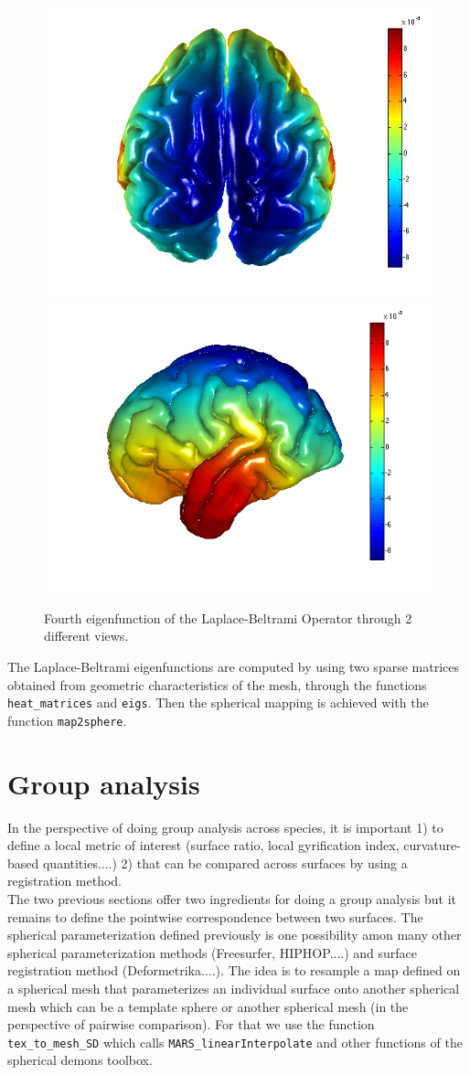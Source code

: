 \documentclass[a4paper, oneside, 12pt, onecolumn]{article}
\begin{document}
\begin{figure}
\center
\includegraphics[width=0.32\linewidth]{Figs/orang_VP4_1.png}
\includegraphics[width=0.32\linewidth]{Figs/orang_VP4_2.png}
\caption{Fourth eigenfunction of the Laplace-Beltrami Operator through 2 different views.}
\label{Fig3}
\end{figure}

The Laplace-Beltrami eigenfunctions are computed by using two sparse matrices obtained from geometric characteristics of the mesh, through the functions \texttt{heat\_matrices} and \texttt{eigs}. Then the spherical mapping is achieved with the function \texttt{map2sphere}.

\section{Group analysis}

In the perspective of doing group analysis across species, it is important 1) to define a local metric of interest (surface ratio, local gyrification index, curvature-based quantities....) 2) that can be compared across surfaces by using a registration method.\\

The two previous sections offer two ingredients for doing a group analysis but it remains to define the pointwise correspondence between two surfaces. The spherical parameterization defined previously is one possibility amon many other spherical parameterization methods (Freesurfer, HIPHOP....) and surface registration method (Deformetrika....). The idea is to resample a map defined on a spherical mesh that parameterizes an individual surface onto another spherical mesh which can be a template sphere or another spherical mesh (in the perspective of pairwise comparison). For that we use the function \texttt{tex\_to\_mesh\_SD} which calls \texttt{MARS\_linearInterpolate} and other functions of the spherical demons toolbox.\\
\end{document}
